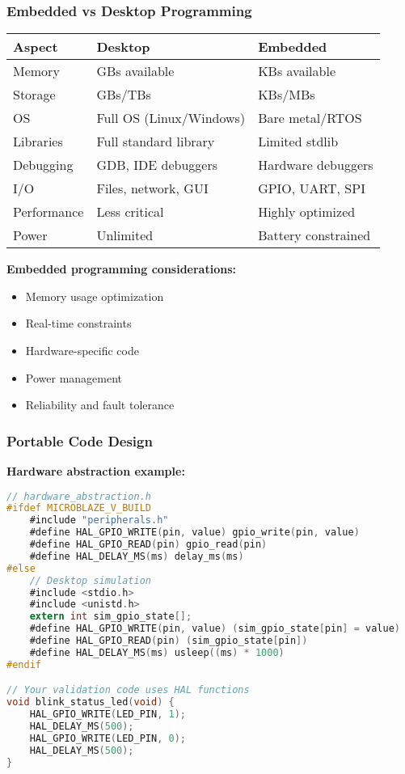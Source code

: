 \documentclass{beamer}
\begin{document}
\begin{frame}
\frametitle{Embedded vs Desktop Programming}
\begin{center}
\begin{tabular}{|l|l|l|}
\hline
\textbf{Aspect} & \textbf{Desktop} & \textbf{Embedded} \\
\hline
Memory & GBs available & KBs available \\
Storage & GBs/TBs & KBs/MBs \\
OS & Full OS (Linux/Windows) & Bare metal/RTOS \\
Libraries & Full standard library & Limited stdlib \\
Debugging & GDB, IDE debuggers & Hardware debuggers \\
I/O & Files, network, GUI & GPIO, UART, SPI \\
Performance & Less critical & Highly optimized \\
Power & Unlimited & Battery constrained \\
\hline
\end{tabular}
\end{center}

\vspace{0.5cm}
\textbf{Embedded programming considerations:}
\begin{itemize}
    \item Memory usage optimization
    \item Real-time constraints
    \item Hardware-specific code
    \item Power management
    \item Reliability and fault tolerance
\end{itemize}
\end{frame}

\begin{frame}[fragile]
\frametitle{Portable Code Design}
\textbf{Hardware abstraction example:}
\begin{lstlisting}[language=C]
// hardware_abstraction.h
#ifdef MICROBLAZE_V_BUILD
    #include "peripherals.h"
    #define HAL_GPIO_WRITE(pin, value) gpio_write(pin, value)
    #define HAL_GPIO_READ(pin) gpio_read(pin)
    #define HAL_DELAY_MS(ms) delay_ms(ms)
#else
    // Desktop simulation
    #include <stdio.h>
    #include <unistd.h>
    extern int sim_gpio_state[];
    #define HAL_GPIO_WRITE(pin, value) (sim_gpio_state[pin] = value)
    #define HAL_GPIO_READ(pin) (sim_gpio_state[pin])
    #define HAL_DELAY_MS(ms) usleep((ms) * 1000)
#endif

// Your validation code uses HAL functions
void blink_status_led(void) {
    HAL_GPIO_WRITE(LED_PIN, 1);
    HAL_DELAY_MS(500);
    HAL_GPIO_WRITE(LED_PIN, 0);
    HAL_DELAY_MS(500);
}
\end{lstlisting}
\end{frame}
\end{document}
